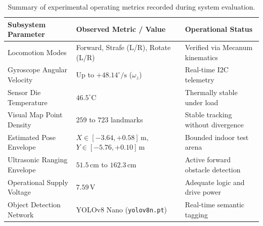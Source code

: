 \begin{table}[htbp]
\centering
\small
\caption{Summary of experimental operating metrics recorded during system evaluation.}
\label{tab:experimental_summary}
\renewcommand{\arraystretch}{1.3}
\begin{tabularx}{\textwidth}{>{\raggedright\arraybackslash}p{4.2cm} >{\raggedright\arraybackslash}X >{\raggedright\arraybackslash}p{4.0cm}}
\hline
\textbf{Subsystem Parameter} & \textbf{Observed Metric / Value} & \textbf{Operational Status} \\ \hline
Locomotion Modes & Forward, Strafe (L/R), Rotate (L/R) & Verified via Mecanum kinematics \\ \hline
Gyroscope Angular Velocity & Up to $+48.14^\circ/\text{s}$ ($\omega_z$) & Real-time I2C telemetry \\ \hline
Sensor Die Temperature & $46.5^\circ\text{C}$ & Thermally stable under load \\ \hline
Visual Map Point Density & $259$ to $723$ landmarks & Stable tracking without divergence \\ \hline
Estimated Pose Envelope & $X \in [-3.64, +0.58]\,\text{m}$, $Y \in [-5.76, +0.10]\,\text{m}$ & Bounded indoor test arena \\ \hline
Ultrasonic Ranging Envelope & $51.5\,\text{cm}$ to $162.3\,\text{cm}$ & Active forward obstacle detection \\ \hline
Operational Supply Voltage & $7.59\,\text{V}$ & Adequate logic and drive power \\ \hline
Object Detection Network & YOLOv8 Nano (\texttt{yolov8n.pt}) & Real-time semantic tagging \\ \hline
\end{tabularx}
\end{table}